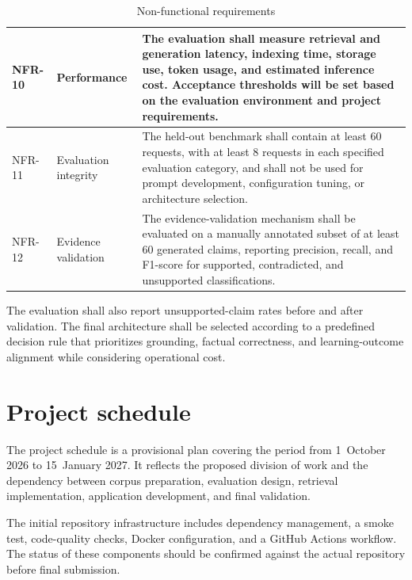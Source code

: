 \documentclass[12pt,a4paper]{article}
\begin{document}
\begin{table}[htbp]
\begin{tabularx}{\textwidth}{|p{12mm}|p{33mm}|X|}
NFR-10 &
Performance &
The evaluation shall measure retrieval and generation latency,
indexing time, storage use, token usage, and estimated
inference cost. Acceptance thresholds will be set based on
the evaluation environment and project requirements. \\
\hline

NFR-11 &
Evaluation integrity &
The held-out benchmark shall contain at least 60 requests,
with at least 8 requests in each specified evaluation category,
and shall not be used for prompt development, configuration
tuning, or architecture selection. \\
\hline

NFR-12 &
Evidence validation &
The evidence-validation mechanism shall be evaluated on a
manually annotated subset of at least 60 generated claims,
reporting precision, recall, and F1-score for supported,
contradicted, and unsupported classifications. \\
\hline

\end{tabularx}
\caption{Non-functional requirements}
\label{tab:nonfunctional-requirements}
\end{table}

The evaluation shall also report unsupported-claim rates before
and after validation. The final architecture shall be selected
according to a predefined decision rule that prioritizes
grounding, factual correctness, and learning-outcome alignment
while considering operational cost.

\clearpage

\section{Project schedule}
\label{sec:schedule}

The project schedule is a provisional plan covering the period
from 1~October 2026 to 15~January 2027. It reflects the proposed
division of work and the dependency between corpus preparation,
evaluation design, retrieval implementation, application
development, and final validation.

The initial repository infrastructure includes dependency
management, a smoke test, code-quality checks, Docker
configuration, and a GitHub Actions workflow. The status of
these components should be confirmed against the actual
repository before final submission.
\end{document}
